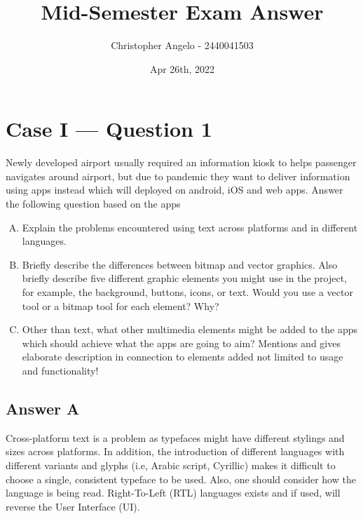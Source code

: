 \documentclass[
  11pt, %
]{assignment}
\author{Christopher Angelo - 2440041503}
\institute{BINUS University\\ Global Class}
\date{Apr 26th, 2022}
\title{Mid-Semester Exam Answer}
\begin{document}
\maketitle


\section*{Case I — Question 1}
\begin{problem}
Newly developed airport usually required an information kiosk to helps passenger navigates around airport, but due to pandemic they want to deliver information using apps instead which will deployed on android, iOS and web apps. Answer the following question based on the apps

\medskip

\begin{enumerate}[A.]
      \item Explain the problems encountered using text across platforms and in different languages.
      \item Briefly describe the differences between bitmap and vector graphics. Also briefly describe five different graphic elements you might use in the project, for example, the background, buttons, icons, or text. Would you use a vector tool or a bitmap tool for each element? Why?
      \item Other than text, what other multimedia elements might be added to the apps which should achieve what the apps are going to aim? Mentions and gives elaborate description in connection to elements added not limited to usage and functionality!
\end{enumerate}
\end{problem}

\subsection*{Answer A}

Cross-platform text is a problem as typefaces might have different stylings and sizes across platforms. In addition, the introduction of different languages with different variants and glyphs (i.e, Arabic script, Cyrillic) makes it difficult to choose a single, consistent typeface to be used. Also, one should consider how the language is being read. Right-To-Left (RTL) languages exists and if used, will reverse the User Interface (UI).
\end{document}
